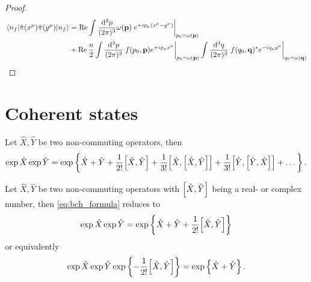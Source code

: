\begin{proof}
	\begin{equation*}
		\begin{split}
			\expval{\hat\pi(x^\mu)\hat\pi(y^\mu)}{n_f}
			&=
			\Re
			\int\frac{\dd[3]{p}}{(2\pi)^3}
			\omega(\vb{p})
			\eval{e^{+ip_\mu(x^\mu-y^\mu)}}_{p_0=\omega(\vb{p})}
			\\
			&+
			\Re
			\frac{n}{2}
			\int\frac{\dd[3]{p}}{(2\pi)^3}
			\eval{
				f(p_0,\vb{p})
				e^{+ip_\mu x^\mu}
			}_{p_0=\omega(\vb{p})}
			\int\frac{\dd[3]{q}}{(2\pi)^3}
			\eval{
				f(q_0,\vb{q})^*
				e^{-iq_\mu y^\mu}
			}_{q_0=\omega(\vb{q})}
		\end{split}
	\end{equation*}
\end{proof}

\section{Coherent states}

\begin{theorem}
	Let $\hat{X},\hat{Y}$ be two non-commuting operators, then
	\begin{equation}\label{eq:bch_formula}
		\exp\hat{X}
		\exp\hat{Y}
		=
		\exp\left\{
			\hat{X}
			+
			\hat{Y}
			+
			\frac{1}{2!}
			\comm{\hat{X}}{\hat{Y}}
			+
			\frac{1}{3!}
			\comm{\hat{X}}{\comm{\hat{X}}{\hat{Y}}}
			+
			\frac{1}{3!}
			\comm{\hat{Y}}{\comm{\hat{Y}}{\hat{X}}}
			+
			\dots		
		\right\}
		.
	\end{equation}
\end{theorem}
\begin{corollary}
	Let $\hat{X},\hat{Y}$ be two non-commuting operators with $\comm{\hat{X}}{\hat{Y}}$ being a real- or complex number, then \cref{eq:bch_formula} reduces to
	\begin{equation}\label{eq:bch_formula_reduced1}
		\exp\hat{X}
		\exp\hat{Y}
		=
		\exp\left\{
			\hat{X}
			+
			\hat{Y}
			+
			\frac{1}{2!}
			\comm{\hat{X}}{\hat{Y}}
		\right\}
	\end{equation}
	or equivalently
	\begin{equation}\label{eq:bch_formula_reduced2}
		\exp\hat{X}
		\exp\hat{Y}
		\exp\left\{
			-
			\frac{1}{2!}
			\comm{\hat{X}}{\hat{Y}}
		\right\}
		=
		\exp\left\{
			\hat{X}
			+
			\hat{Y}
		\right\}
		.
	\end{equation}
\end{corollary}

